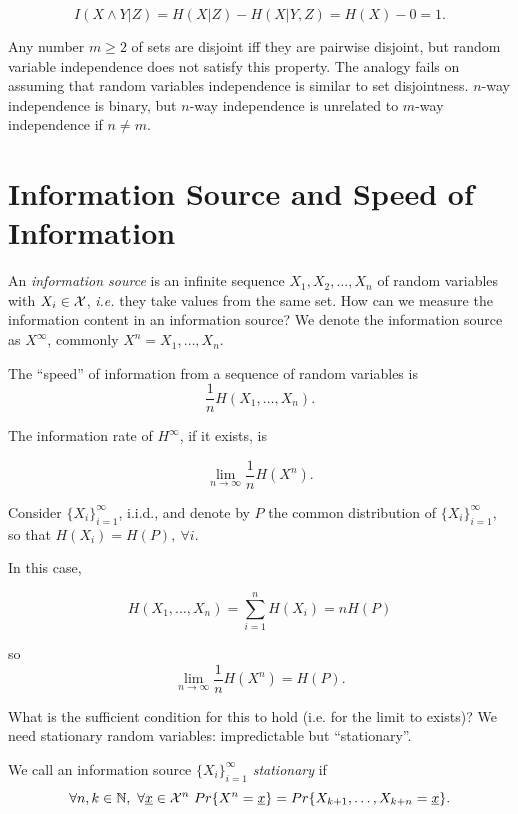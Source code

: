 \[
 I(X\wedge Y|Z) = H(X|Z) - H(X|Y, Z) = H(X) - 0 = 1.
\]

Any number $m \geq 2$ of sets are disjoint iff they are pairwise disjoint, but random variable independence does not satisfy this property. The analogy fails on assuming that random variables independence is similar to set disjointness. $n$-way independence is binary, but $n$-way independence is unrelated to $m$-way independence if $n \not= m$.

\section{Information Source and Speed of Information}

An \emph{information source} is an infinite sequence $X_1, X_2, \ldots, X_n$ of random variables with $X_i \in \mathcal{X}$, \emph{i.e.} they take values from the same set. How can we measure the information content in an information source? We denote the information source as $X^\infty$, commonly $X^n = X_1, \ldots, X_n$. 

The ``speed'' of information from a sequence of random variables is 
\begin{equation}
\dfrac{1}{n}H(X_1, \ldots, X_n).
\end{equation}

The information rate of $H^\infty$, if it exists, is

\begin{equation}
 \lim_{n \rightarrow \infty} \dfrac{1}{n}H(X^n). 
\end{equation}


Consider $\{X_i\}_{i = 1}^\infty$, i.i.d., and denote by $P$ the common distribution of $\{X_i\}_{i = 1}^\infty$, so that $H(X_i) = H(P),\ \forall i.$

In this case,

\begin{equation}
 H(X_1, \ldots, X_n) = \sum_{i = 1}^n H(X_i) = nH(P)
\end{equation}

so
\begin{equation}
 \lim_{n \rightarrow \infty} \dfrac{1}{n}H(X^n) = H(P).
\end{equation}

What is the sufficient condition for this to hold (i.e. for the limit to exists)? We need stationary random variables: impredictable but ``stationary''. 
\begin{definition}
We call an information source $\{X_i\}_{i = 1}^\infty$ \emph{stationary} if 
\[
 \forall n,k \in \mathbb{N},\ \forall \underline{x} \in \mathcal{X}^n\ Pr\{X^n=\underline{x}\} = Pr\{X_{k+1}, \ldots, X_{k+n} = \underline{x}\}.
\] 
\end{definition}


